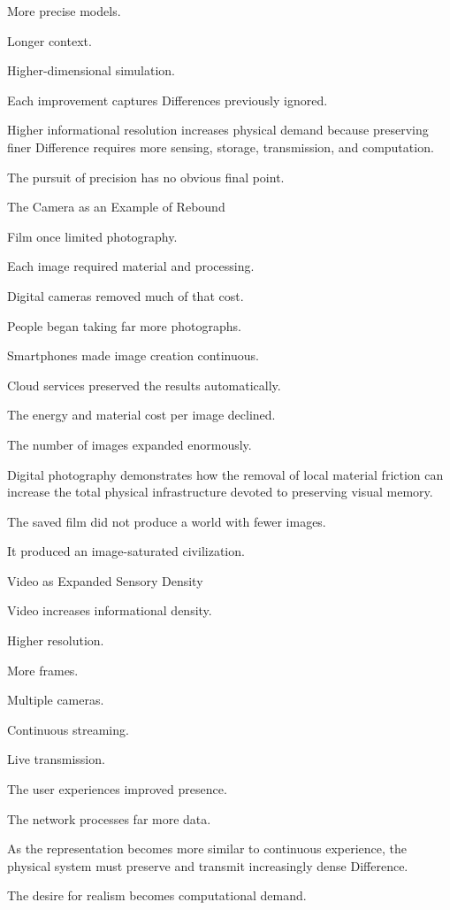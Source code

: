 More precise models.

Longer context.

Higher-dimensional simulation.

Each improvement captures Differences previously ignored.

Higher informational resolution increases physical demand because preserving finer Difference requires more sensing, storage, transmission, and computation.

The pursuit of precision has no obvious final point.

The Camera as an Example of Rebound

Film once limited photography.

Each image required material and processing.

Digital cameras removed much of that cost.

People began taking far more photographs.

Smartphones made image creation continuous.

Cloud services preserved the results automatically.

The energy and material cost per image declined.

The number of images expanded enormously.

Digital photography demonstrates how the removal of local material friction can increase the total physical infrastructure devoted to preserving visual memory.

The saved film did not produce a world with fewer images.

It produced an image-saturated civilization.

Video as Expanded Sensory Density

Video increases informational density.

Higher resolution.

More frames.

Multiple cameras.

Continuous streaming.

Live transmission.

The user experiences improved presence.

The network processes far more data.

As the representation becomes more similar to continuous experience, the physical system must preserve and transmit increasingly dense Difference.

The desire for realism becomes computational demand.

